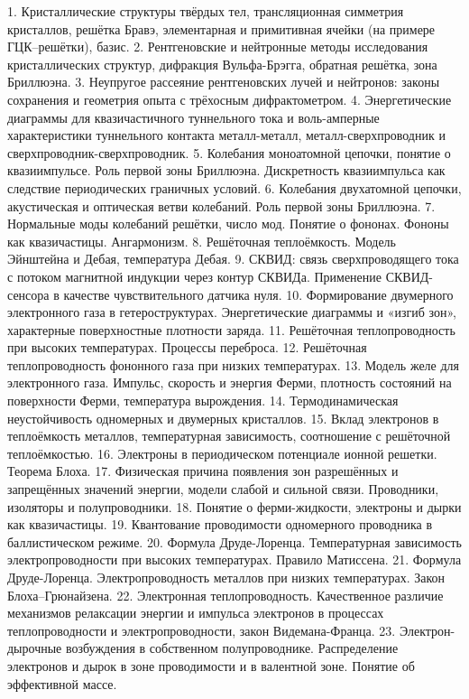 1. Кристаллические структуры твёрдых тел, трансляционная симметрия кристаллов, решётка Бравэ, элементарная и примитивная ячейки (на примере ГЦК--решётки), базис.
2. Рентгеновские и нейтронные методы исследования кристаллических структур, дифракция Вульфа-Брэгга, обратная решётка, зона Бриллюэна.
3. Неупругое рассеяние рентгеновских лучей и нейтронов: законы сохранения и геометрия опыта с трёхосным дифрактометром.
4. Энергетические диаграммы для квазичастичного туннельного тока и воль-амперные характеристики туннельного контакта металл-металл, металл-сверхпроводник и сверхпроводник-сверхпроводник.
5. Колебания моноатомной цепочки, понятие о квазиимпульсе. Роль первой зоны Бриллюэна. Дискретность квазиимпульса как следствие периодических граничных условий.
6. Колебания двухатомной цепочки, акустическая и оптическая ветви колебаний. Роль первой зоны Бриллюэна.
7. Нормальные моды колебаний решётки, число мод. Понятие о фононах. Фононы как квазичастицы. Ангармонизм.
8. Решёточная теплоёмкость. Модель Эйнштейна и Дебая, температура Дебая.
9. СКВИД: связь сверхпроводящего тока с потоком магнитной индукции через контур СКВИДа. Применение СКВИД-сенсора в качестве чувствительного датчика нуля.
10. Формирование двумерного электронного газа в гетероструктурах. Энергетические диаграммы и «изгиб зон», характерные поверхностные плотности заряда.
11. Решёточная теплопроводность при высоких температурах. Процессы переброса.
12. Решёточная теплопроводность фононного газа при низких температурах.
13. Модель желе для электронного газа. Импульс, скорость и энергия Ферми, плотность состояний на поверхности Ферми, температура вырождения.
14. Термодинамическая неустойчивость одномерных и двумерных кристаллов.
15. Вклад электронов в теплоёмкость металлов, температурная зависимость, соотношение с решёточной теплоёмкостью.
16. Электроны в периодическом потенциале ионной решетки. Теорема Блоха.
17. Физическая причина появления зон разрешённых и запрещённых значений энергии, модели слабой и сильной связи. Проводники, изоляторы и полупроводники.
18. Понятие о ферми-жидкости, электроны и дырки как квазичастицы.
19. Квантование проводимости одномерного проводника в баллистическом режиме.
20. Формула Друде-Лоренца. Температурная зависимость электропроводности при высоких температурах. Правило Матиссена.
21. Формула Друде-Лоренца. Электропроводность металлов при низких температурах. Закон Блоха--Грюнайзена.
22. Электронная теплопроводность. Качественное различие механизмов релаксации энергии и импульса электронов в процессах теплопроводности и электропроводности, закон Видемана-Франца.
23. Электрон-дырочные возбуждения в собственном полупроводнике. Распределение электронов и дырок в зоне проводимости и в валентной зоне. Понятие об эффективной массе.

